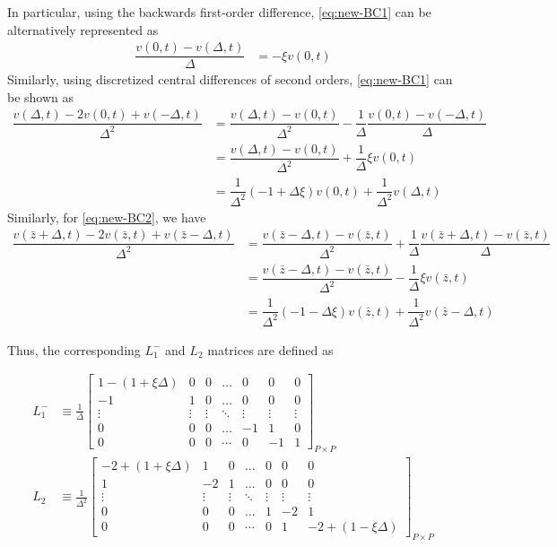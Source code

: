 \documentclass[11pt]{article}
\begin{document}
In particular, using the backwards first-order difference, \eqref{eq:new-BC1} can be alternatively represented as
\begin{align}
\dfrac{v(0, t) - v(\Delta, t)}{\Delta} &= - \xi v(0,t)
\end{align}
Similarly, using discretized central differences of second orders, \eqref{eq:new-BC1} can be shown as
\begin{align}
\dfrac{v (\Delta, t) - 2 v(0, t) + v(-\Delta, t)}{\Delta^2} &=   \dfrac{v(\Delta, t) - v(0, t)}{\Delta^2} - \dfrac{1}{\Delta}\dfrac{v (0, t) - v(-\Delta, t) }{\Delta}  \\
&= \dfrac{v(\Delta, t) - v(0, t)}{\Delta^2} + \dfrac{1}{\Delta} \xi v(0, t)  \\ 
&= \dfrac{1}{\Delta^2}  (- 1 + \Delta \xi) v(0,t)  + \dfrac{1}{\Delta^2}  v(\Delta, t)  
\end{align}
Similarly, for \eqref{eq:new-BC2}, we have
\begin{align}
\dfrac{v (\bar{z} + \Delta, t) - 2 v(\bar{z} , t) + v(\bar{z} -\Delta, t)}{\Delta^2} &=   \dfrac{v(\bar{z} - \Delta, t) - v(\bar{z}, t)}{\Delta^2} + \dfrac{1}{\Delta}\dfrac{ v(\bar{z}+\Delta, t) - v (\bar{z}, t) }{\Delta}  \\
&= \dfrac{v(\bar{z} - \Delta, t) - v(\bar{z}, t)}{\Delta^2}  - \dfrac{1}{\Delta} \xi v(\bar{z}, t)  \\ 
&= \dfrac{1}{\Delta^2}  (- 1 - \Delta \xi) v(\bar{z},t)  + \dfrac{1}{\Delta^2}  v(\bar{z} - \Delta, t)  
\end{align}

Thus, the corresponding $L_1^{-}$ and $L_2$ matrices are defined as 

\begin{align}
L_1^{-} &\equiv \frac{1}{\Delta}\begin{bmatrix}
1 - (1 + \xi \Delta) &0&0&\dots&0&0&0\\
-1&1&0&\dots&0&0&0\\
\vdots&\vdots&\vdots&\ddots&\vdots&\vdots&\vdots\\
0&0&0&\dots&-1&1&0\\
0&0&0&\cdots&0&-1&1
\end{bmatrix}_{P\times P}\label{eq:L-1} \\
L_2 &\equiv \frac{1}{\Delta^2}\begin{bmatrix}
-2 + (1 + \xi\Delta) &1&0&\dots&0&0&0\\
1&-2&1&\dots&0&0&0\\
\vdots&\vdots&\vdots&\ddots&\vdots&\vdots&\vdots\\
0&0&0&\dots&1&-2&1\\
0&0&0&\cdots&0&1&-2 + (1- \xi\Delta)
\end{bmatrix}_{P\times P}\label{eq:L-2}
\end{align}
\end{document}

